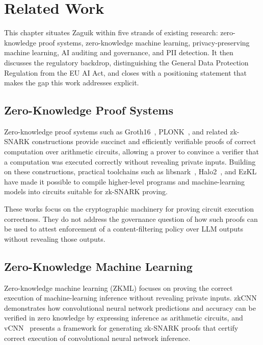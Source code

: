 \chapter{Related Work}
\label{chap:related-work}

This chapter situates Zaguik within five strands of existing research: zero-knowledge proof systems, zero-knowledge machine learning, privacy-preserving machine learning, AI auditing and governance, and PII detection. It then discusses the regulatory backdrop, distinguishing the General Data Protection Regulation from the EU AI Act, and closes with a positioning statement that makes the gap this work addresses explicit.

\section{Zero-Knowledge Proof Systems}
\label{sec:rw-zkp-systems}

Zero-knowledge proof systems such as Groth16~\cite{groth2016size}, PLONK~\cite{gabizon2019plonk}, and related zk-SNARK constructions provide succinct and efficiently verifiable proofs of correct computation over arithmetic circuits, allowing a prover to convince a verifier that a computation was executed correctly without revealing private inputs. Building on these constructions, practical toolchains such as libsnark~\cite{bensasson2014vn}, Halo2~\cite{halo2}, and EzKL~\cite{ezkl} have made it possible to compile higher-level programs and machine-learning models into circuits suitable for zk-SNARK proving.

\medskip

These works focus on the cryptographic machinery for proving circuit execution correctness. They do not address the governance question of how such proofs can be used to attest enforcement of a content-filtering policy over LLM outputs without revealing those outputs.

\section{Zero-Knowledge Machine Learning}
\label{sec:rw-zkml}

Zero-knowledge machine learning (ZKML) focuses on proving the correct execution of machine-learning inference without revealing private inputs. zkCNN~\cite{liu2021zkcnn} demonstrates how convolutional neural network predictions and accuracy can be verified in zero knowledge by expressing inference as arithmetic circuits, and vCNN~\cite{lee2024vcnn} presents a framework for generating zk-SNARK proofs that certify correct execution of convolutional neural network inference.

